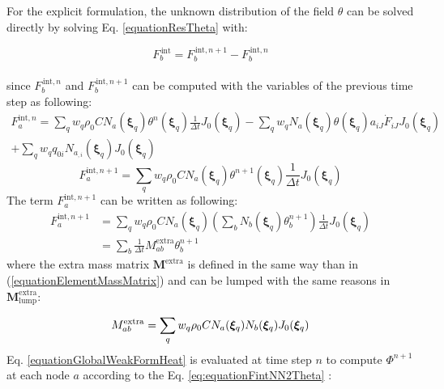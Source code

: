 \documentclass[oneside,11pt,times]{book}
\begin{document}
For the explicit formulation, the unknown distribution of the field $\theta$ can be solved directly by solving Eq. \eqref{equationResTheta} with:

%
\begin{equation} \label{equationResThetaExpl}
{F}_{b}^{\,\text{int}} =  {F}_{b}^{\,\text{int}, n+1} - {F}_{b}^{\,\text{int}, n}
\end{equation}
%
\\
since ${F}_{b}^{\,\text{int},n}$ and ${F}_{b}^{\,\text{int},n+1}$ can be computed with the variables of the previous time step as following:
\begin{equation}
\begin{split} 
{F}^{\text{int},n}_a=\sum_q w_q \rho_0 C N_a(\bm{\xi}_q) \theta^n (\bm{\xi}_q)\frac{1}{\Delta t}J_0(\bm{\xi}_q) -\sum_q w_q N_a(\bm{\xi}_q)\theta(\bm{\xi}_q) a_{iJ}\dot{F}_{iJ}J_0(\bm{\xi}_q) \\+\sum_q w_q q_{0i} N_{a_{,i}}(\bm{\xi}_q)J_0(\bm{\xi}_q)
\end{split}
\label{equationFintNTheta}
\end{equation}
\begin{equation}
{F}^{\text{int},n+1}_a  = \sum_q w_q \rho_0 C N_a(\bm{\xi}_q) \theta^{n+1} (\bm{\xi}_q)\frac{1}{\Delta t}J_0(\bm{\xi}_q)
\label{equationFintNNTheta}
\end{equation}
The term ${F}^{\text{int},n+1}_a$ can be written as following:
\begin{equation}
\begin{split}
{F}^{\text{int},n+1}_a & =  \sum_q w_q \rho_0 C N_a(\bm{\xi}_q) \left(\sum_b N_b(\bm{\xi}_q) \theta_{b}^{n+1} \right)\frac{1}{\Delta t}J_0(\bm{\xi}_q)\\
& =  \sum_b \frac{1}{\Delta t} M_{ab}^{\text{extra}} \theta_{b}^{n+1}
\label{eq:equationFintNN2Theta}
\end{split}
\end{equation}
where the extra mass matrix $\bm{M}^{\text{extra}}$ is defined in the same way than in (\ref{equationElementMassMatrix}) and can be lumped with the same reasons in $\bm{M}_{\text{lump}}^{\text{extra}}$:

\begin{equation}
\begin{aligned}
\centering
M_{ab}^{\text{extra}}=\sum_q w_q \rho_0 C N_a(\bm{\xi}_q) N_b(\bm{\xi}_q) J_0(\bm{\xi}_q)
\end{aligned}
\label{equationMassMatExp}
\end{equation}
Eq. \eqref{equationGlobalWeakFormHeat} is evaluated at time step $n$ to compute $\Phi^{n+1}$ at each node $a$ according to the Eq. \eqref{eq:equationFintNN2Theta} :
\end{document}
